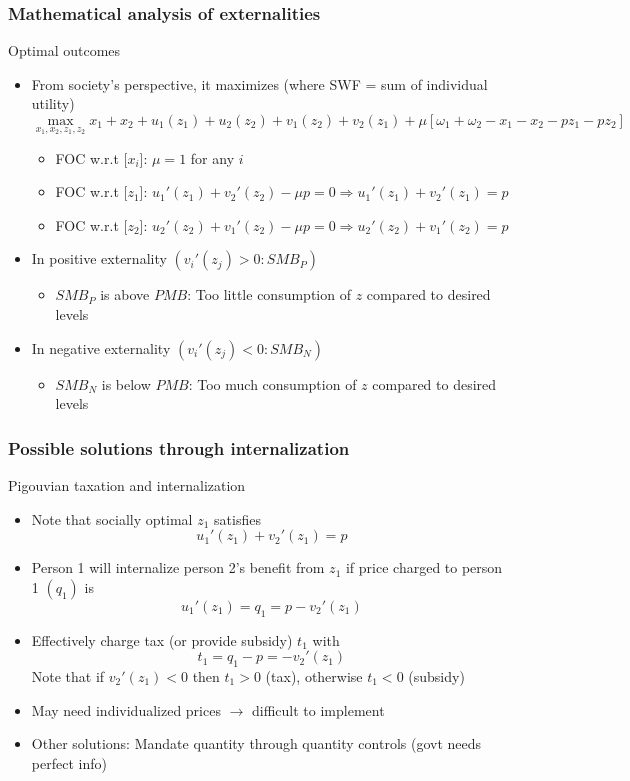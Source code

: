 \documentclass[aspectratio=169]{beamer}
\begin{document}
\begin{frame}
\frametitle{Mathematical analysis of externalities} 
Optimal outcomes
\begin{itemize}\setlength\itemsep{3pt}
  \item From society's perspective, it maximizes (where SWF = sum of individual utility)
  \[
  \max_{x_1,x_2, z_1,z_2} x_1 +x_2 + u_1(z_1)+u_2(z_2)+v_1(z_2)+v_2(z_1) + \mu[\omega_1+\omega_2 - x_1-x_2-pz_1-pz_2]
  \]\vspace{-10pt}
  \begin{itemize}\setlength\itemsep{3pt}
    \item FOC w.r.t [$x_i$]: $\mu=1$ for any $i$
    \item FOC w.r.t [$z_1$]: $u_1'(z_1)+v_2'(z_2)-\mu p=0 \Rightarrow u_1'(z_1)+v_2'(z_1)=p $
    \item FOC w.r.t [$z_2$]: $u_2'(z_2)+v_1'(z_2)-\mu p=0 \Rightarrow u_2'(z_2)+v_1'(z_2)=p $
  \end{itemize}\smallskip
\item In positive externality $(v_i'(z_j)>0: SMB_P)$
 \begin{itemize}\setlength\itemsep{3pt}
    \item $SMB_P$ is above $PMB$: Too little consumption of $z$ compared to desired levels
  \end{itemize}   \smallskip 
\item In negative externality $(v_i'(z_j)<0: SMB_N)$
\begin{itemize}\setlength\itemsep{3pt}
    \item $SMB_N$ is below $PMB$: Too much consumption of $z$ compared to desired levels
  \end{itemize}    
\end{itemize}
\end{frame}


\begin{frame}
\frametitle{Possible solutions through internalization} 
Pigouvian taxation and internalization
\begin{itemize}\setlength\itemsep{3pt}
\item Note that socially optimal $z_1$ satisfies
\[
u_1'(z_1) + v_2'(z_1)=p
\]
\item Person 1 will internalize person 2's benefit from $z_1$ if price charged to person 1 $(q_1)$ is
\[
u_1'(z_1)=q_1 = p-v_2'(z_1) 
\]
\item Effectively charge tax (or provide subsidy) $t_1$ with
\[
t_1=q_1-p = -v_2'(z_1) 
\]
Note that if $v_2'(z_1)<0$ then $t_1>0$ (tax), otherwise $t_1<0$ (subsidy)
\item May need individualized prices $\to$ difficult to implement
\item Other solutions: Mandate quantity through quantity controls (govt needs perfect info)
\end{itemize}\medskip
\end{frame}
\end{document}
